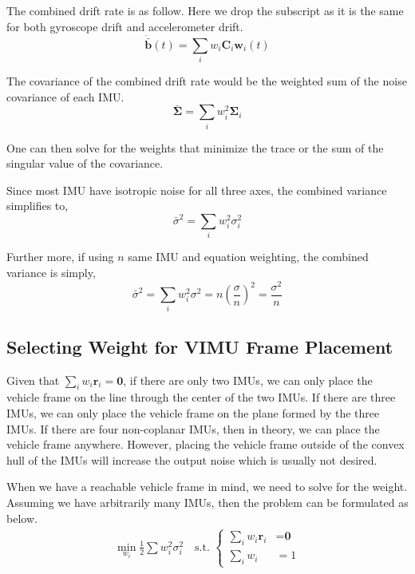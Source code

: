 \documentclass[conference]{IEEEtran}
\begin{document}
The combined drift rate is as follow. Here we drop the subscript as it is the same for both gyroscope drift and accelerometer drift.
\begin{equation}
    \dot{\bar{\textbf{b}}}(t) = \sum_i{w_i \textbf{C}_i \textbf{w}_i(t)}
\end{equation}

The covariance of the combined drift rate would be the weighted sum of the noise covariance of each IMU.
\begin{equation}
    \bar{\bm{\Sigma}} = \sum_i{w_i^2 \bm{\Sigma}_i}
\end{equation}

One can then solve for the weights that minimize the trace or the sum of the singular value of the covariance.

Since most IMU have isotropic noise for all three axes, the combined variance simplifies to,
\begin{equation}\label{noise_reduction_asym}
    \bar{\sigma}^2 = \sum_i{w_i^2 \sigma_i^2}
\end{equation}

Further more, if using $n$ same IMU and equation weighting, the combined variance is simply,
\begin{equation}\label{noise_reduction_sym}
    \bar{\sigma}^2 = \sum_i{w_i^2 \sigma^2} = n \left(\frac{\sigma}{n}\right)^2 = \frac{\sigma^2}{n}
\end{equation}

\subsection{Selecting Weight for VIMU Frame Placement}

Given that $\sum_i{w_i \textbf{r}_i} = \textbf{0}$, if there are only two IMUs, we can only place the vehicle frame on the line through the center of the two IMUs. If there are three IMUs, we can only place the vehicle frame on the plane formed by the three IMUs. If there are four non-coplanar IMUs, then in theory, we can place the vehicle frame anywhere. However, placing the vehicle frame outside of the convex hull of the IMUs will increase the output noise which is usually not desired.

When we have a reachable vehicle frame in mind, we need to solve for the weight. Assuming we have arbitrarily many IMUs, then the problem can be formulated as below.
\begin{equation}
\begin{split}
    \min_{w_i}{\frac{1}{2} \sum{w_i^2 \sigma_i^2}} \quad \text{s.t. }
    \begin{cases}
      \sum_i{w_i \textbf{r}_i} &= \textbf{0} \\
      \sum_i{w_i} &= 1
    \end{cases}
\end{split}
\end{equation}
\end{document}
